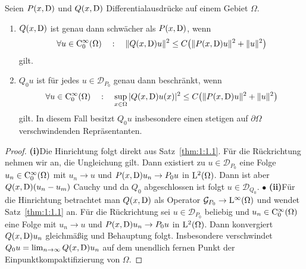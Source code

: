 \begin{lem}\label{lm: Qu stetig}
Seien $P(x,\mathrm D)$ und $Q(x,\mathrm D)$ Differentialausdr\"ucke auf einem Gebiet $\Omega$. 
\begin{enumerate}
\item
$Q(x,\mathrm D)$ ist genau dann schwächer als $P(x,\mathrm D)$, wenn
\begin{equation}\label{eq:1:1.21}
    \forall u\in\mathrm C^\infty_0(\Omega)\quad:\quad \| Q(x,\mathrm D)u\|^2 \le C \big( \| P(x,\mathrm D)u\|^2 + \|u\|^2 \big)
\end{equation}
gilt.
\item
$Q_0 u$ ist für jedes $u\in\mathcal D_{P_0}$ genau dann beschränkt, wenn
\begin{equation}
    \forall u\in\mathrm C^\infty_0(\Omega)\quad:\quad  \sup_{x\in\Omega} | Q(x,\mathrm D) u(x) |^2 \le C \big( \| P(x,\mathrm D)u\|^2 + \|u\|^2 \big)
\end{equation}
gilt. In diesem Fall besitzt $Q_0u$ insbesondere einen stetigen auf $\partial\Omega$ verschwindenden Repräsentanten.
\end{enumerate}
\end{lem}
\begin{proof}
{\bf (i)}\quad Die Hinrichtung folgt direkt aus Satz~\ref{thm:1:1.1}. Für die Rückrichtung nehmen wir an, die Ungleichung gilt. Dann existiert zu $u\in\mathcal D_{P_0}$ eine Folge $u_n\in\mathrm C_0^\infty(\Omega)$ mit $u_n\to u$ und $P(x,\mathrm D) u_n\to P_0 u$ in $\mathrm L^2(\Omega)$. Dann ist aber $Q(x,\mathrm D)(u_n-u_m)$ Cauchy und da $Q_0$ abgeschlossen ist folgt $u\in\mathcal D_{Q_0}$. $\bullet$\qquad
{\bf (ii)}\quad Für die Hinrichtung betrachtet man $Q(x,\mathrm D)$ als Operator $\mathcal G_{P_0}\to\mathrm L^\infty(\Omega)$ und wendet Satz~\ref{thm:1:1.1} an. Für die Rückrichtung sei $u\in\mathcal D_{P_0}$ beliebig und $u_n\in\mathrm C_0^\infty(\Omega)$ eine Folge mit $u_n\to u$ und $P(x,\mathrm D)u_n\to P_0u$ in $\mathrm L^2(\Omega)$.
Dann konvergiert $ Q(x,\mathrm D)u_n$ gleichmäßig und Behauptung folgt. Insbesondere verschwindet $Q_0u = \lim_{n\to\infty}  Q(x,\mathrm D) u_n$ auf dem unendlich fernen Punkt der Einpunktkompaktifizierung von $\Omega$.
\end{proof}

